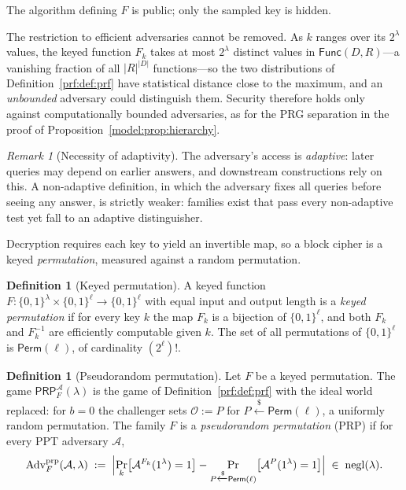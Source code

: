 \documentclass[11pt,a4paper]{article}
\theoremstyle{definition}
\newtheorem{definition}[theorem]{Definition}
\theoremstyle{remark}
\newtheorem{remark}[theorem]{Remark}
\DeclareMathOperator{\negl}{negl}
\providecommand{\abs}[1]{\lvert #1 \rvert}
\begin{document}
The algorithm defining \(F\) is public; only the sampled key is hidden.

The restriction to efficient adversaries cannot be removed. As \(k\)
ranges over its \(2^{\lambda}\) values, the keyed function \(F_{k}\)
takes at most \(2^{\lambda}\) distinct values in
\(\mathsf{Func}(D, R)\)---a vanishing fraction of all
\(\abs{R}^{\abs{D}}\) functions---so the two distributions of
Definition~\ref{prf:def:prf} have statistical distance close to the
maximum, and an \emph{unbounded} adversary could distinguish them.
Security therefore holds only against computationally bounded
adversaries, as for the PRG separation in the proof of
Proposition~\ref{model:prop:hierarchy}.

\begin{remark}[Necessity of adaptivity]\label{prf:rem:adaptive}
The adversary's access is \emph{adaptive}: later queries may depend on
earlier answers, and downstream constructions rely on this. A
non-adaptive definition, in which the adversary fixes all queries
before seeing any answer, is strictly weaker: families exist that pass
every non-adaptive test yet fall to an adaptive distinguisher.
\end{remark}

Decryption requires each key to yield an invertible map, so a block
cipher is a keyed \emph{permutation}, measured against a random
permutation.

\begin{definition}[Keyed permutation]\label{prf:def:keyedperm}
A keyed function
\(F \colon \{0,1\}^{\lambda} \times \{0,1\}^{\ell} \to
\{0,1\}^{\ell}\) with equal input and output length is a \emph{keyed
permutation} if for every key \(k\) the map \(F_{k}\) is a bijection
of \(\{0,1\}^{\ell}\), and both \(F_{k}\) and \(F_{k}^{-1}\) are
efficiently computable given \(k\). The set of all permutations of
\(\{0,1\}^{\ell}\) is \(\mathsf{Perm}(\ell)\), of cardinality
\((2^{\ell})!\).
\end{definition}

\begin{definition}[Pseudorandom permutation]\label{prf:def:prp}
Let \(F\) be a keyed permutation. The game
\(\mathsf{PRP}^{\mathcal{A}}_{F}(\lambda)\) is the game of
Definition~\ref{prf:def:prf} with the ideal world replaced: for
\(b = 0\) the challenger sets \(\mathcal{O} := P\) for
\(P \xleftarrow{\$} \mathsf{Perm}(\ell)\), a uniformly random
permutation. The family \(F\) is a \emph{pseudorandom permutation}
(PRP) if for every PPT adversary \(\mathcal{A}\),
\[
\mathrm{Adv}^{\mathrm{prp}}_{F}(\mathcal{A}, \lambda)
\;:=\;
\Bigl|
\Pr_{k}\bigl[\mathcal{A}^{F_{k}}(1^{\lambda}) = 1\bigr]
-
\Pr_{P \xleftarrow{\$} \mathsf{Perm}(\ell)}
  \bigl[\mathcal{A}^{P}(1^{\lambda}) = 1\bigr]
\Bigr|
\;\in\; \negl(\lambda).
\]
\end{definition}
\end{document}
